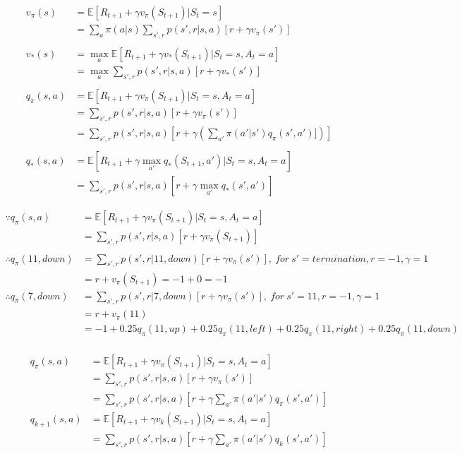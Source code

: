 \documentclass{article}
\begin{document}
\[
  \begin{aligned}
  v_{\pi}(s) &= \mathbb{E}[R_{t+1} + \gamma v_{\pi}(S_{t+1}) | S_{t}=s] \\
  &= \sum_{a}\pi(a|s) \sum_{s',r}p(s',r|s,a)[r + \gamma v_{\pi}(s')]\\
  \\
  v_{*}(s) &= \max_{a}\mathbb{E}[R_{t+1} + \gamma v_{*}(S_{t+1}) | S_{t}=s, A_{t}=a]\\
  &= \max_{a}\sum_{s',r}p(s',r|s,a)[r + \gamma v_{*}(s')]\\
  \\
  q_{\pi}(s,a) &= \mathbb{E}[R_{t+1} + \gamma v_{\pi}(S_{t+1}) | S_{t}=s, A_{t}=a]\\
  &= \sum_{s',r}p(s',r|s,a)[r + \gamma v_{\pi}(s')]\\
  &= \sum_{s',r}p(s',r|s,a)[r + \gamma (\sum_{a'}\pi(a'|s') q_{\pi}(s',a')])]\\
  \\
  q_{*}(s,a) &= \mathbb{E}[R_{t+1} + \gamma \max_{a'}q_{*}(S_{t+1}, a') | S_{t}=s, A_{t}=a]\\
  &= \sum_{s',r}p(s',r|s,a)[r + \gamma \max_{a'}q_{*}(s', a')]
  \end{aligned}
\]

\[
  \begin{aligned}
    \because q_{\pi}(s,a) &= \mathbb{E}[R_{t+1} + \gamma v_{\pi}(S_{t+1}) | S_{t}=s, A_{t}=a]\\
    &= \sum_{s',r}p(s',r|s,a)[r + \gamma v_{\pi}(S_{t+1})]\\
    \\
    \therefore q_{\pi}(11,down) &= \sum_{s',r}p(s',r|11,down)[r + \gamma v_{\pi}(s')], \  for \  s'=termination, r=-1, \gamma = 1\\
    &= r + v_{\pi}(S_{t+1}) = -1 + 0 = -1 \\
    \therefore q_{\pi}(7,down) &= \sum_{s',r}p(s',r|7,down)[r + \gamma v_{\pi}(s')], \  for \  s'=11, r=-1, \gamma = 1\\
    &= r + v_{\pi}(11) \\
    &= -1 + 0.25q_{\pi}(11,up) + 0.25q_{\pi}(11,left) + 0.25q_{\pi}(11,right) + 0.25q_{\pi}(11,down)\\
  \end{aligned}
\]

\[
  \begin{aligned}
    q_{\pi}(s,a) &= \mathbb{E}[R_{t+1} + \gamma v_{\pi}(S_{t+1}) | S_{t}=s, A_{t}=a]\\
    &= \sum_{s',r}p(s',r|s,a)[r + \gamma v_{\pi}(s')]\\
    &= \sum_{s',r}p(s',r|s,a)[r + \gamma \sum_{a'}\pi(a'|s')q_{\pi}(s',a')]\\
    q_{k+1}(s, a) &= \mathbb{E}[R_{t+1} + \gamma v_{k}(S_{t+1}) | S_{t}=s, A_{t}=a]\\
    &= \sum_{s',r}p(s',r|s,a)[r + \gamma \sum_{a'}\pi(a'|s')q_{k}(s',a')]
  \end{aligned}
\]
\end{document}
